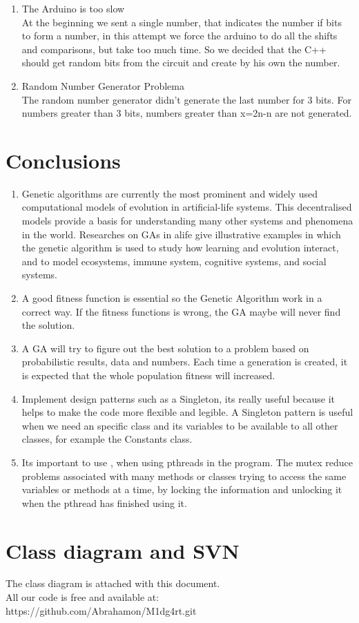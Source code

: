 \documentclass[twocolumn]{IEEEtran}
\begin{document}
\begin{enumerate}
	\item The Arduino is too slow\\
    At the beginning we sent a single number, that indicates the number if bits to form a number, in 
    this attempt we force the arduino to do all the shifts and comparisons, but take too much time. So we decided that the C++ should get random bits from the circuit and create by his own the number.
    
    \item Random Number Generator Problema\\
    The random number generator didn't generate the last number for 3 bits. For numbers greater than 3 bits, numbers greater than x=2n-n are not generated. 
	
\end{enumerate}


\section{Conclusions}
\begin{enumerate}
    \item Genetic algorithms are currently the most prominent and widely used computational models of evolution in artificial-life systems. This decentralised models provide a basis for understanding many other systems and phenomena in the world. Researches on GAs in alife give illustrative examples in which the genetic algorithm is used to study how learning and evolution interact, and to model ecosystems, immune system, cognitive systems, and social systems.
    \item A good fitness function is essential so the Genetic Algorithm work in a correct way. If the fitness functions is wrong, the GA maybe will never find the solution.
    \item A GA will try to figure out the best solution to a problem based on probabilistic results, data and numbers. Each time a generation is created, it is expected that the whole population fitness will increased.
    \item Implement design patterns such as a Singleton, its really useful because it helps to make the code more flexible and legible. A Singleton pattern is useful when we need an specific class and its variables to be available to all other classes, for example the Constants class.
    \item Its important to use , when using pthreads in the program. The mutex reduce problems associated with many methods or classes trying to access the same variables or methods at a time, by locking the information and unlocking it when the pthread has finished using it.
\end{enumerate}



\section{Class diagram and SVN}

	The class diagram is attached with this document.\\
    
    All our code is free and available at:\\ https://github.com/Abrahamon/M1dg4rt.git \\ 




\end{document}
